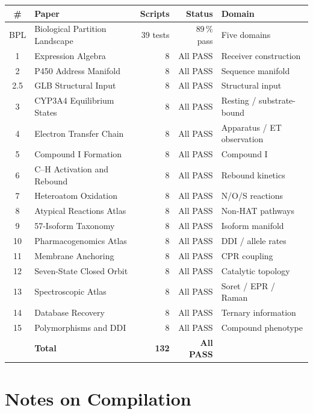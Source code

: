 \documentclass[11pt,a4paper,openany,twoside]{book}
\theoremstyle{definition}
\theoremstyle{remark}
\begin{document}
\bigskip
\begin{center}
\begin{tabular}{clrrl}
\toprule
\# & Paper & Scripts & Status & Domain \\
\midrule
BPL & Biological Partition Landscape & 39 tests & $89\,\%$ pass & Five domains \\
\midrule
1  & Expression Algebra             & 8  & All PASS & Receiver construction \\
2  & P450 Address Manifold          & 8  & All PASS & Sequence manifold \\
2.5 & GLB Structural Input          & 8  & All PASS & Structural input \\
3  & CYP3A4 Equilibrium States      & 8  & All PASS & Resting / substrate-bound \\
4  & Electron Transfer Chain        & 8  & All PASS & Apparatus / ET observation \\
5  & Compound I Formation           & 8  & All PASS & Compound I \\
6  & C--H Activation and Rebound    & 8  & All PASS & Rebound kinetics \\
7  & Heteroatom Oxidation           & 8  & All PASS & N/O/S reactions \\
8  & Atypical Reactions Atlas       & 8  & All PASS & Non-HAT pathways \\
9  & 57-Isoform Taxonomy            & 8  & All PASS & Isoform manifold \\
10 & Pharmacogenomics Atlas         & 8  & All PASS & DDI / allele rates \\
11 & Membrane Anchoring             & 8  & All PASS & CPR coupling \\
12 & Seven-State Closed Orbit       & 8  & All PASS & Catalytic topology \\
13 & Spectroscopic Atlas            & 8  & All PASS & Soret / EPR / Raman \\
14 & Database Recovery              & 8  & All PASS & Ternary information \\
15 & Polymorphisms and DDI          & 8  & All PASS & Compound phenotype \\
\midrule
   & \textbf{Total}                 & \textbf{132} & \textbf{All PASS} & \\
\bottomrule
\end{tabular}
\end{center}

\chapter*{Notes on Compilation}
\end{document}
